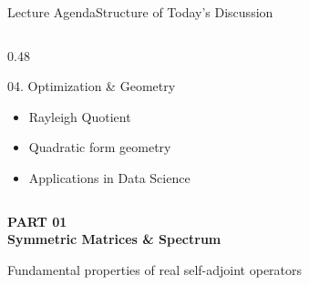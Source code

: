 \documentclass[10pt, aspectratio=169]{beamer}
\begin{document}
\begin{frame}{Lecture Agenda}{Structure of Today's Discussion}
\begin{columns}[T]
\begin{column}{0.48\textwidth}
      \begin{conceptbox}{04. Optimization \& Geometry}
        \small
        \begin{itemize}
          \setlength{\itemsep}{1pt}
          \item Rayleigh Quotient
          \item Quadratic form geometry
          \item Applications in Data Science
        \end{itemize}
      \end{conceptbox}
    \end{column}
  \end{columns}
\end{frame}

\begin{frame}[plain]
  \vspace*{1.8cm}
  \begin{center}
    {\color{teal}\small\bfseries PART 01} \\[0.2cm]
    {\color{navy}\huge\bfseries Symmetric Matrices \& Spectrum} \\[0.3cm]
    \par\vspace{0.3cm}
    {\color{slate}\small Fundamental properties of real self-adjoint operators}
  \end{center}
\end{frame}
\end{document}
